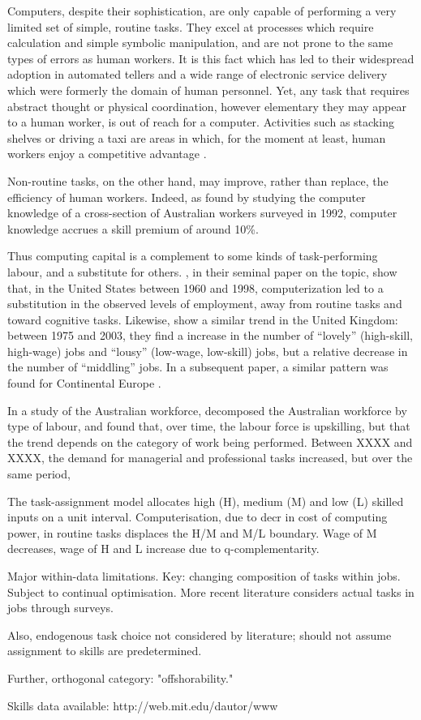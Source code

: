 Computers, despite their sophistication, are only capable of performing a very limited set of simple, routine tasks. They excel at processes which require calculation and simple symbolic manipulation, and are not prone to the same types of errors as human workers. It is this fact which has led to their widespread adoption in automated tellers and a wide range of electronic service delivery which were formerly the domain of human personnel. Yet, any task that requires abstract thought or physical coordination, however elementary they may appear to a human worker, is out of reach for a computer. Activities such as stacking shelves or driving a taxi are areas in which, for the moment at least, human workers enjoy a competitive advantage \citet{Levy2003}. 

Non-routine tasks, on the other hand, may improve, rather than replace, the efficiency of human workers. Indeed, as \citet{Borland2004} found by studying the computer knowledge of a cross-section of Australian workers surveyed in 1992, computer knowledge accrues a skill premium of around 10\%.

Thus computing capital is a complement to some kinds of task-performing labour, and a substitute for others. \cite{Levy2003}, in their seminal paper on the topic, show that, in the United States between 1960 and 1998, computerization led to a substitution in the observed levels of employment, away from routine tasks and toward cognitive tasks. Likewise, \citet{Goos2007} show a similar trend in the United Kingdom: between 1975 and 2003, they find a increase in the number of ``lovely'' (high-skill, high-wage) jobs and ``lousy'' (low-wage, low-skill) jobs, but a relative decrease in the number of ``middling'' jobs. In a subsequent paper, a similar pattern was found for Continental Europe \citep{Goos2009}.

In a study of the Australian workforce, \citet{Esposto2012} decomposed the Australian workforce by type of labour, and found that, over time, the labour force is upskilling, but that the trend depends on the category of work being performed. Between XXXX and XXXX, the demand for managerial and professional tasks increased, but over the same period, 

The task-assignment model allocates high (H), medium (M) and low (L) skilled inputs on a unit interval. Computerisation, due to decr in cost of computing power, in routine tasks displaces the H/M and M/L boundary. Wage of M decreases, wage of H and L increase due to q-complementarity.

Major within-data limitations. Key: changing composition of tasks within jobs. Subject to continual optimisation. More recent literature considers actual tasks in jobs through surveys.
        
Also, endogenous task choice not considered by literature; should not assume assignment to skills are predetermined.
        
Further, orthogonal category: "offshorability."

Skills data available: http://web.mit.edu/dautor/www


